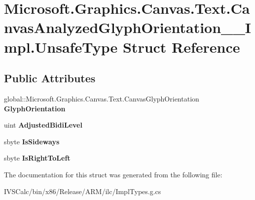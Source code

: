 \hypertarget{struct_microsoft_1_1_graphics_1_1_canvas_1_1_text_1_1_canvas_analyzed_glyph_orientation_____impl_1_1_unsafe_type}{}\section{Microsoft.\+Graphics.\+Canvas.\+Text.\+Canvas\+Analyzed\+Glyph\+Orientation\+\_\+\+\_\+\+Impl.\+Unsafe\+Type Struct Reference}
\label{struct_microsoft_1_1_graphics_1_1_canvas_1_1_text_1_1_canvas_analyzed_glyph_orientation_____impl_1_1_unsafe_type}
\subsection*{Public Attributes}
\begin{DoxyCompactItemize}
\item 
\mbox{\label{struct_microsoft_1_1_graphics_1_1_canvas_1_1_text_1_1_canvas_analyzed_glyph_orientation_____impl_1_1_unsafe_type_ad53b89a4a115080d07ac4e88db397bfb}} 
global\+::\+Microsoft.\+Graphics.\+Canvas.\+Text.\+Canvas\+Glyph\+Orientation {\bfseries Glyph\+Orientation}
\item 
\mbox{\label{struct_microsoft_1_1_graphics_1_1_canvas_1_1_text_1_1_canvas_analyzed_glyph_orientation_____impl_1_1_unsafe_type_a2b563342a1804ae3ae20e66da7f1a396}} 
uint {\bfseries Adjusted\+Bidi\+Level}
\item 
\mbox{\label{struct_microsoft_1_1_graphics_1_1_canvas_1_1_text_1_1_canvas_analyzed_glyph_orientation_____impl_1_1_unsafe_type_a4c482cdd7baa45592d97ab0d23e57b51}} 
sbyte {\bfseries Is\+Sideways}
\item 
\mbox{\label{struct_microsoft_1_1_graphics_1_1_canvas_1_1_text_1_1_canvas_analyzed_glyph_orientation_____impl_1_1_unsafe_type_a051bc7e2b67881323b895b1a26d00cdd}} 
sbyte {\bfseries Is\+Right\+To\+Left}
\end{DoxyCompactItemize}


The documentation for this struct was generated from the following file\+:\begin{DoxyCompactItemize}
\item 
I\+V\+S\+Calc/bin/x86/\+Release/\+A\+R\+M/ilc/Impl\+Types.\+g.\+cs\end{DoxyCompactItemize}
